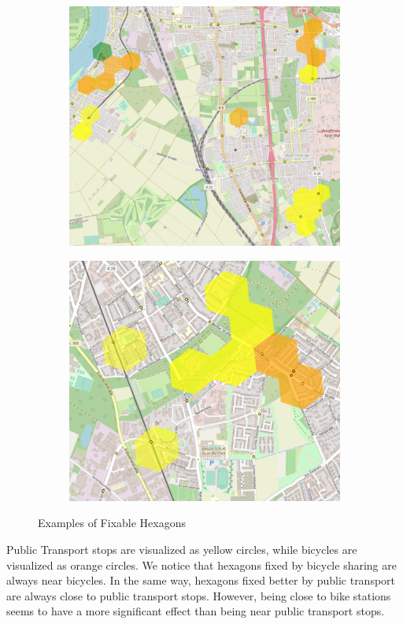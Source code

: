 \begin{figure}
\begin{subfigure}[b]{0.45\textwidth}
         \includegraphics[width=\textwidth]{Figures/results/problematic_hexagons/example_3.png}
     \end{subfigure}
     \hfill
     \begin{subfigure}[b]{0.45\textwidth}
         \centering
         \includegraphics[width=\textwidth]{Figures/results/problematic_hexagons/example_4.png}
     \end{subfigure}
     \caption{Examples of Fixable Hexagons}
        \label{fig:fixable_hexagons_examples}
\end{figure}
Public Transport stops are visualized as yellow circles, while bicycles are visualized as orange circles.
We notice that hexagons fixed by bicycle sharing are always near bicycles.
In the same way, hexagons fixed better by public transport are always close to public transport stops. 
However, being close to bike stations seems to have a more significant effect than being near public transport stops.

